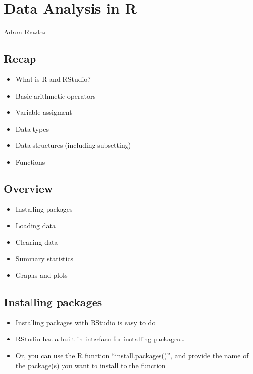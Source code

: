 \documentclass[]{article}
\title{}
\author{}
\date{}
\providecommand{\tightlist}{%
  \setlength{\itemsep}{0pt}\setlength{\parskip}{0pt}}
\begin{document}
\section{Data Analysis in R}\label{data-analysis-in-r}

Adam Rawles

\subsection{Recap}\label{recap}

\begin{itemize}
\tightlist
\item
  What is R and RStudio?
\item
  Basic arithmetic operators
\item
  Variable assigment
\item
  Data types
\item
  Data structures (including subsetting)
\item
  Functions
\end{itemize}

\subsection{Overview}\label{overview}

\begin{itemize}
\tightlist
\item
  Installing packages
\item
  Loading data
\item
  Cleaning data
\item
  Summary statistics
\item
  Graphs and plots
\end{itemize}

\subsection{Installing packages}\label{installing-packages}

\begin{itemize}
\tightlist
\item
  Installing packages with RStudio is easy to do
\item
  RStudio has a built-in interface for installing packages\ldots{}
\item
  Or, you can use the R function ``install.packages()'', and provide the
  name of the package(s) you want to install to the function
\end{itemize}
\end{document}
